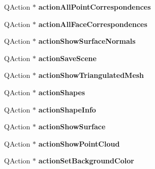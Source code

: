 \begin{DoxyCompactItemize}
\item 
\hypertarget{class_ui___shape_analyzer_a21ab5275fdbe080f47d1f6b24596a4d6}{}Q\+Action $\ast$ {\bfseries action\+All\+Point\+Correspondences}\label{class_ui___shape_analyzer_a21ab5275fdbe080f47d1f6b24596a4d6}

\item 
\hypertarget{class_ui___shape_analyzer_a49434d2f734a3fa5ebd270c9522c81c4}{}Q\+Action $\ast$ {\bfseries action\+All\+Face\+Correspondences}\label{class_ui___shape_analyzer_a49434d2f734a3fa5ebd270c9522c81c4}

\item 
\hypertarget{class_ui___shape_analyzer_a7246406adc57509c586a81697e84b0f9}{}Q\+Action $\ast$ {\bfseries action\+Show\+Surface\+Normals}\label{class_ui___shape_analyzer_a7246406adc57509c586a81697e84b0f9}

\item 
\hypertarget{class_ui___shape_analyzer_ac953acffa9baf360758dee4acb8b52df}{}Q\+Action $\ast$ {\bfseries action\+Save\+Scene}\label{class_ui___shape_analyzer_ac953acffa9baf360758dee4acb8b52df}

\item 
\hypertarget{class_ui___shape_analyzer_a93f1e996846e3a4a9822133f4c5161d2}{}Q\+Action $\ast$ {\bfseries action\+Show\+Triangulated\+Mesh}\label{class_ui___shape_analyzer_a93f1e996846e3a4a9822133f4c5161d2}

\item 
\hypertarget{class_ui___shape_analyzer_ab39f08f751f42e18337f810207db3d98}{}Q\+Action $\ast$ {\bfseries action\+Shapes}\label{class_ui___shape_analyzer_ab39f08f751f42e18337f810207db3d98}

\item 
\hypertarget{class_ui___shape_analyzer_a4adcc4cd368420a3d75ae370d62162a7}{}Q\+Action $\ast$ {\bfseries action\+Shape\+Info}\label{class_ui___shape_analyzer_a4adcc4cd368420a3d75ae370d62162a7}

\item 
\hypertarget{class_ui___shape_analyzer_addc87be5e7ca1b03ca78b62ee469036a}{}Q\+Action $\ast$ {\bfseries action\+Show\+Surface}\label{class_ui___shape_analyzer_addc87be5e7ca1b03ca78b62ee469036a}

\item 
\hypertarget{class_ui___shape_analyzer_a94b285055b051dccbc0c259dc8cb2d59}{}Q\+Action $\ast$ {\bfseries action\+Show\+Point\+Cloud}\label{class_ui___shape_analyzer_a94b285055b051dccbc0c259dc8cb2d59}

\item 
\hypertarget{class_ui___shape_analyzer_a463723f6d9741f2335ee2b284379b01b}{}Q\+Action $\ast$ {\bfseries action\+Set\+Background\+Color}\label{class_ui___shape_analyzer_a463723f6d9741f2335ee2b284379b01b}


\end{DoxyCompactItemize}
